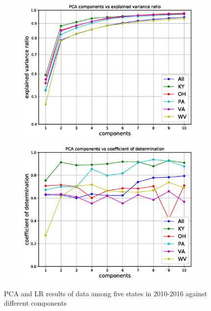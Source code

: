 \documentclass{mcmthesis}
\begin{document}
    \begin{figure}[H]
    \centering
    \begin{subfigure}[b]{0.48\textwidth}
        \includegraphics[width=\textwidth]{../figure/pca_state_ratio.eps}
        \label{fig:pca_state_ratio}
    \end{subfigure}\hfill
    \begin{subfigure}[b]{0.48\textwidth}
        \includegraphics[width=\textwidth]{../figure/pca_state_score.eps}
        \label{fig:pca_state_score}
    \end{subfigure}
    \caption{PCA and LR results of data among five states in 2010-2016 against different components}\label{fig:pca_state}
\end{figure}
\end{document}
